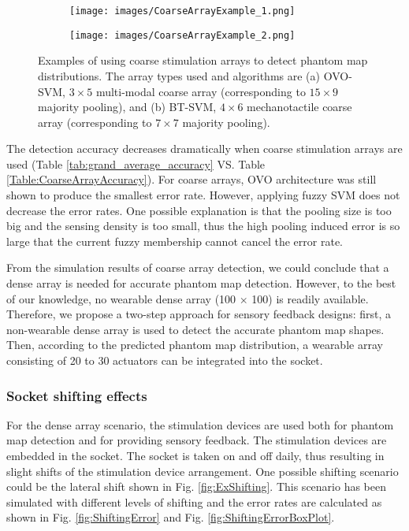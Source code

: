 \begin{figure}[htbp]
    \centering
    \begin{subfigure}[b]{0.43\textwidth}
        \texttt{[image: images/CoarseArrayExample\_1.png]}
        \caption{}
    \end{subfigure}
    \begin{subfigure}[b]{0.43\textwidth}
        \texttt{[image: images/CoarseArrayExample\_2.png]}
        \caption{}
    \end{subfigure}
    \caption{Examples of using coarse stimulation arrays to detect phantom map distributions. The array types used and algorithms are (a) OVO-SVM,  $3\times 5$ multi-modal coarse array (corresponding to $15 \times 9$ majority pooling), and (b) BT-SVM, $4 \times 6$ mechanotactile coarse array (corresponding to $7 \times 7$ majority pooling).  }
    \label{fig:CoarseArrayExample}
\end{figure} 

The detection accuracy decreases dramatically when coarse stimulation arrays are used (Table \ref{tab:grand_average_accuracy} VS. Table \ref{Table:CoarseArrayAccuracy}). For coarse arrays, OVO architecture was still shown to produce the smallest error rate. However, applying fuzzy SVM does not decrease the error rates. One possible explanation is that the pooling size is too big and the sensing density is too small, thus the high pooling induced error is so large that the current fuzzy membership cannot cancel the error rate.

From the simulation results of coarse array detection, we could conclude that a dense array is needed for accurate phantom map detection. However, to the best of our knowledge, no wearable dense array (100 $\times$ 100) is readily available. Therefore, we propose a two-step approach for sensory feedback designs: first, a non-wearable dense array is used to detect the accurate phantom map shapes. Then, according to the predicted phantom map distribution, a wearable array consisting of 20 to 30 actuators can be integrated into the socket.
                                 
                                                                                                   
\subsubsection{Socket shifting effects}
For the dense array scenario, the stimulation devices are used both for phantom map detection and for providing sensory feedback. The stimulation devices are embedded in the socket. The socket is taken on and off daily, thus resulting in slight shifts of the stimulation device arrangement. One possible shifting scenario could be the lateral shift shown in Fig. \ref{fig:ExShifting}. This scenario has been simulated with different levels of shifting and the error rates are calculated as shown in Fig. \ref{fig:ShiftingError} and Fig. \ref{fig:ShiftingErrorBoxPlot}.

